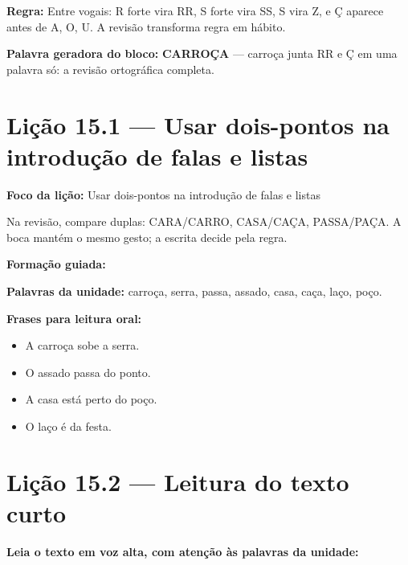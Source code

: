 \textbf{Regra:} Entre vogais: R forte vira RR, S forte vira SS, S vira Z, e Ç aparece antes de A, O, U. A revisão transforma regra em hábito.

\textbf{Palavra geradora do bloco:} \textbf{CARROÇA} --- carroça junta RR e Ç em uma palavra só: a revisão ortográfica completa.

\section{Lição 15.1 --- Usar dois-pontos na introdução de falas e listas}

\textbf{Foco da lição:} Usar dois-pontos na introdução de falas e listas


\begin{boquinha}
Na revisão, compare duplas: CARA/CARRO, CASA/CAÇA, PASSA/PAÇA. A boca mantém o mesmo gesto; a escrita decide pela regra.
\end{boquinha}

\noindent\textbf{Formação guiada:}

\begin{center}
\end{center}

\noindent\textbf{Palavras da unidade:} carroça, serra, passa, assado, casa, caça, laço, poço.

\noindent\textbf{Frases para leitura oral:}
\begin{itemize}[leftmargin=1.6em]
  \item A carroça sobe a serra.
  \item O assado passa do ponto.
  \item A casa está perto do poço.
  \item O laço é da festa.
\end{itemize}

\section{Lição 15.2 --- Leitura do texto curto}

\noindent\textbf{Leia o texto em voz alta, com atenção às palavras da unidade:}


